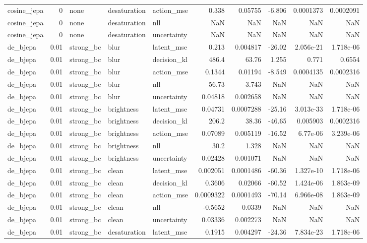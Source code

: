 \begin{tabular}{lrlllrrrrr}
cosine\_jepa & 0 & none & desaturation & action\_mse & 0.338 & 0.05755 & -6.806 & 0.0001373 & 0.0002091 \\
cosine\_jepa & 0 & none & desaturation & nll & NaN & NaN & NaN & NaN & NaN \\
cosine\_jepa & 0 & none & desaturation & uncertainty & NaN & NaN & NaN & NaN & NaN \\
de\_bjepa & 0.01 & strong\_bc & blur & latent\_mse & 0.213 & 0.004817 & -26.02 & 2.056e-21 & 1.718e-06 \\
de\_bjepa & 0.01 & strong\_bc & blur & decision\_kl & 486.4 & 63.76 & 1.255 & 0.771 & 0.6554 \\
de\_bjepa & 0.01 & strong\_bc & blur & action\_mse & 0.1344 & 0.01194 & -8.549 & 0.0004135 & 0.0002316 \\
de\_bjepa & 0.01 & strong\_bc & blur & nll & 56.73 & 3.743 & NaN & NaN & NaN \\
de\_bjepa & 0.01 & strong\_bc & blur & uncertainty & 0.04818 & 0.002658 & NaN & NaN & NaN \\
de\_bjepa & 0.01 & strong\_bc & brightness & latent\_mse & 0.04731 & 0.0007288 & -25.16 & 3.013e-33 & 1.718e-06 \\
de\_bjepa & 0.01 & strong\_bc & brightness & decision\_kl & 206.2 & 38.36 & -46.65 & 0.005903 & 0.0002316 \\
de\_bjepa & 0.01 & strong\_bc & brightness & action\_mse & 0.07089 & 0.005119 & -16.52 & 6.77e-06 & 3.239e-06 \\
de\_bjepa & 0.01 & strong\_bc & brightness & nll & 30.2 & 1.328 & NaN & NaN & NaN \\
de\_bjepa & 0.01 & strong\_bc & brightness & uncertainty & 0.02428 & 0.001071 & NaN & NaN & NaN \\
de\_bjepa & 0.01 & strong\_bc & clean & latent\_mse & 0.002051 & 0.0001486 & -60.36 & 1.327e-10 & 1.718e-06 \\
de\_bjepa & 0.01 & strong\_bc & clean & decision\_kl & 0.3606 & 0.02066 & -60.52 & 1.424e-06 & 1.863e-09 \\
de\_bjepa & 0.01 & strong\_bc & clean & action\_mse & 0.0009322 & 0.0001493 & -70.14 & 6.966e-08 & 1.863e-09 \\
de\_bjepa & 0.01 & strong\_bc & clean & nll & -0.5652 & 0.0339 & NaN & NaN & NaN \\
de\_bjepa & 0.01 & strong\_bc & clean & uncertainty & 0.03336 & 0.002273 & NaN & NaN & NaN \\
de\_bjepa & 0.01 & strong\_bc & desaturation & latent\_mse & 0.1915 & 0.004297 & -24.36 & 7.834e-23 & 1.718e-06 \\

\end{tabular}
